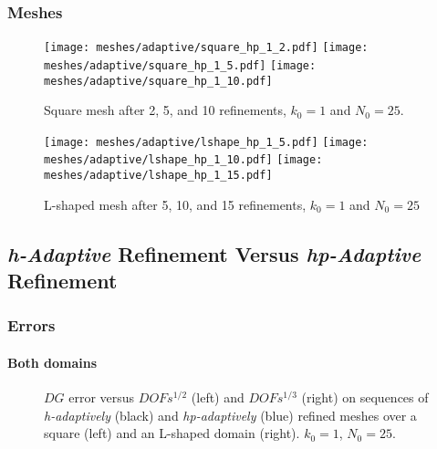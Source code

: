 \begin{frame}
    \frametitle{Meshes}

    \begin{figure}[!ht]
        \centering
        \texttt{[image: meshes/adaptive/square\_hp\_1\_2.pdf]}
        \texttt{[image: meshes/adaptive/square\_hp\_1\_5.pdf]}
        \texttt{[image: meshes/adaptive/square\_hp\_1\_10.pdf]}
        \caption{Square mesh after 2, 5, and 10 refinements, $k_0 = 1$ and $N_0 = 25$.}
    \end{figure}
    
    \begin{figure}[!ht]
        \centering
        \texttt{[image: meshes/adaptive/lshape\_hp\_1\_5.pdf]}
        \texttt{[image: meshes/adaptive/lshape\_hp\_1\_10.pdf]}
        \texttt{[image: meshes/adaptive/lshape\_hp\_1\_15.pdf]}
        \caption{L-shaped mesh after 5, 10, and 15 refinements, $k_0 = 1$ and $N_0 = 25$}
    \end{figure}
\end{frame}

\subsection{\textit{h-Adaptive} Refinement Versus \textit{hp-Adaptive} Refinement}

\begin{frame}[fragile]
    \frametitle{Errors}
    \framesubtitle{Both domains}

    \begin{figure}[!ht]
        
        \caption{$DG$ error versus $DOFs^{1/2}$ (left) and $DOFs^{1/3}$ (right) on sequences of \textit{h-adaptively} (black) and \textit{hp-adaptively} (blue) refined meshes over a square (left) and an L-shaped domain (right). $k_0 = 1$, $N_0 = 25$.}
    \end{figure}
\end{frame}